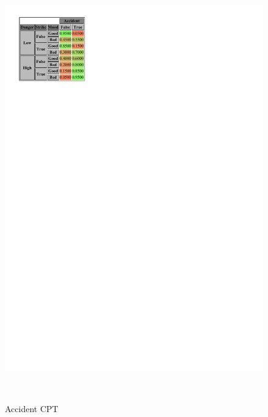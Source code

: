 \documentclass[a4paper,12pt]{article} %
\begin{document}
	\begin{figure}[H]
	\begin{center}
	\centering
	\begin{minipage}[c]{.45\textwidth}
		\centering
		\includegraphics[width=.9\linewidth]{../code/accident.pdf}	
		\caption*{Accident CPT}
		\label{fig:accident}
	\end{minipage}
	~
	\begin{minipage}[c]{.45\textwidth}
		\centering

\end{minipage}
\end{center}
\end{figure}
\end{document}
